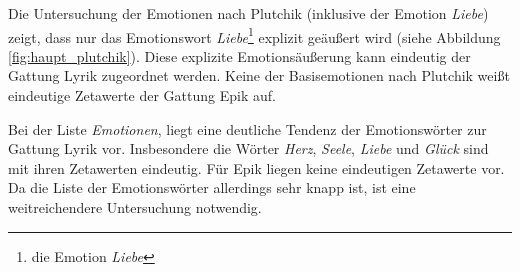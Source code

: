 \documentclass[a4paper,10p]{article}
\begin{document}
Die Untersuchung der Emotionen nach Plutchik (inklusive der Emotion \textit{Liebe}) zeigt, dass nur das Emotionswort \textit{Liebe}\footnote{die Emotion \textit{Liebe}} explizit geäußert wird (siehe Abbildung  \ref{fig:haupt_plutchik}). Diese explizite Emotionsäußerung kann eindeutig der Gattung Lyrik zugeordnet werden. Keine der Basisemotionen nach Plutchik weißt eindeutige Zetawerte der Gattung Epik auf. \par 

Bei der Liste \textit{Emotionen}, liegt eine deutliche Tendenz der Emotionswörter zur Gattung Lyrik vor. Insbesondere die Wörter \textit{Herz}, \textit{Seele},  \textit{Liebe} und \textit{Glück} sind mit ihren Zetawerten eindeutig. Für Epik liegen keine eindeutigen Zetawerte vor. Da die Liste der Emotionswörter allerdings sehr knapp ist, ist eine weitreichendere Untersuchung notwendig.  \par 
\end{document}
